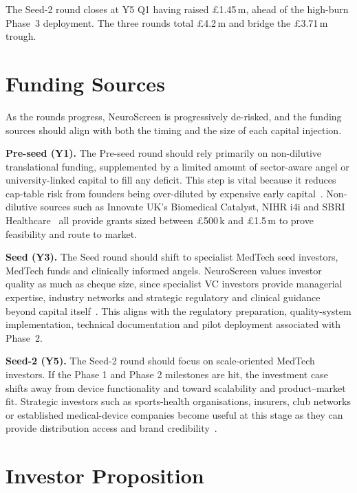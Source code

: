 The Seed-2 round closes at Y5 Q1 having raised \pounds1.45\,m, ahead of the high-burn Phase~3 deployment. The three rounds total \pounds4.2\,m and bridge the \pounds3.71\,m trough.


\section{Funding Sources}
\label{sec:ent-fund-sources}

As the rounds progress, NeuroScreen is progressively de-risked, and the funding sources should align with both the timing and the size of each capital injection.

\textbf{Pre-seed (Y1).} The Pre-seed round should rely primarily on non-dilutive translational funding, supplemented by a limited amount of sector-aware angel or university-linked capital to fill any deficit. This step is vital because it reduces cap-table risk from founders being over-diluted by expensive early capital~\cite{svb_dilution}. Non-dilutive sources such as Innovate UK's Biomedical Catalyst, NIHR i4i and SBRI Healthcare~\cite{ukri_biomedical_catalyst,nihr_i4i,sbri_healthcare} all provide grants sized between \pounds500\,k and \pounds1.5\,m to prove feasibility and route to market.

\textbf{Seed (Y3).} The Seed round should shift to specialist MedTech seed investors, MedTech funds and clinically informed angels. NeuroScreen values investor quality as much as cheque size, since specialist VC investors provide managerial expertise, industry networks and strategic regulatory and clinical guidance beyond capital itself~\cite{oecd_vc_smes,pulse_angels}. This aligns with the regulatory preparation, quality-system implementation, technical documentation and pilot deployment associated with Phase~2.

\textbf{Seed-2 (Y5).} The Seed-2 round should focus on scale-oriented MedTech investors. If the Phase 1 and Phase 2 milestones are hit, the investment case shifts away from device functionality and toward scalability and product--market fit. Strategic investors such as sports-health organisations, insurers, club networks or established medical-device companies become useful at this stage as they can provide distribution access and brand credibility~\cite{jjdc_innovation}.


\section{Investor Proposition}
\label{sec:ent-investor-prop}

